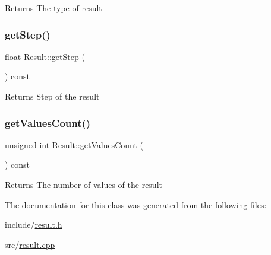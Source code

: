 \begin{DoxyReturn}{Returns}
The type of result 
\end{DoxyReturn}
\mbox{\label{classResult_ae152b587e08f50380c6fc0a54faa08c5}} 
\subsubsection{\texorpdfstring{get\+Step()}{getStep()}}
{\footnotesize\ttfamily float Result\+::get\+Step (\begin{DoxyParamCaption}{ }\end{DoxyParamCaption}) const}

\begin{DoxyReturn}{Returns}
Step of the result 
\end{DoxyReturn}
\mbox{\label{classResult_a13c7c3058d5d8e2b52a31091061199d3}} 
\subsubsection{\texorpdfstring{get\+Values\+Count()}{getValuesCount()}}
{\footnotesize\ttfamily unsigned int Result\+::get\+Values\+Count (\begin{DoxyParamCaption}{ }\end{DoxyParamCaption}) const}

\begin{DoxyReturn}{Returns}
The number of values of the result 
\end{DoxyReturn}


The documentation for this class was generated from the following files\+:\begin{DoxyCompactItemize}
\item 
include/\hyperlink{result_8h}{result.\+h}\item 
src/\hyperlink{result_8cpp}{result.\+cpp}\end{DoxyCompactItemize}
